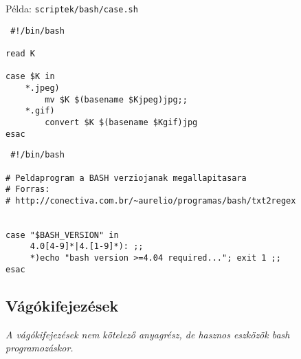\begin{minipage}{0.425\textwidth}
Példa: \texttt{scriptek/bash/case.sh}
\lstset{linewidth=\textwidth}
\begin{lstlisting}
 #!/bin/bash

read K

case $K in
    *.jpeg)
        mv $K $(basename $Kjpeg)jpg;;
    *.gif)
        convert $K $(basename $Kgif)jpg
esac
\end{lstlisting}
\end{minipage}
\hspace{1em}
\begin{minipage}{0.425\textwidth}
\lstset{linewidth=\textwidth}
\begin{lstlisting}
 #!/bin/bash

# Peldaprogram a BASH verziojanak megallapitasara
# Forras: 
# http://conectiva.com.br/~aurelio/programas/bash/txt2regex


case "$BASH_VERSION" in
     4.0[4-9]*|4.[1-9]*): ;;
     *)echo "bash version >=4.04 required..."; exit 1 ;;
esac
\end{lstlisting}
\end{minipage}


\subsection{Vágókifejezések}
\emph{A vágókifejezések nem kötelező anyagrész, de hasznos eszközök bash programozáskor.}

